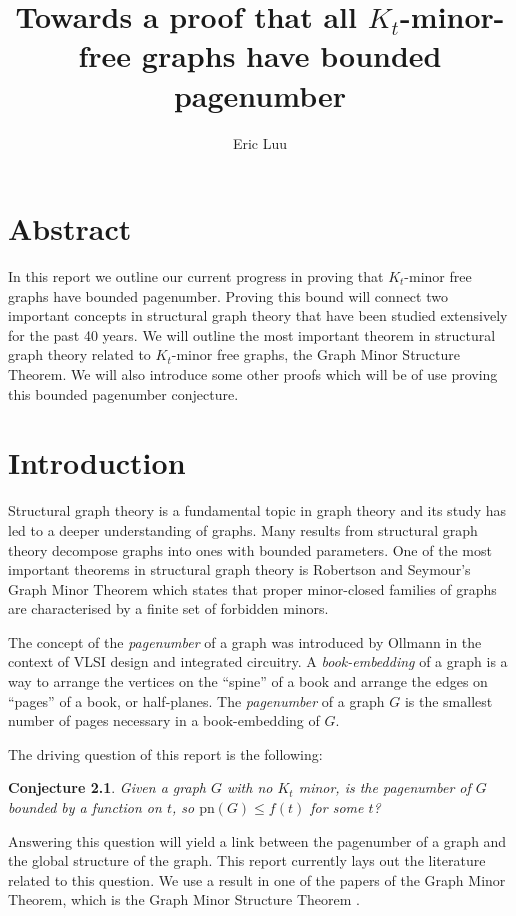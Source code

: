 \documentclass[]{report}
\title{Towards a proof that all $K_t$-minor-free graphs have bounded pagenumber}
\author{Eric Luu}
\newcommand{\pn}{\text{pn}}
\newtheorem{conjecture}[theorem]{Conjecture}
\theoremstyle{definition}
\numberwithin{theorem}{section}
\numberwithin{equation}{section}
\begin{document}
\maketitle
\chapter{Abstract}\label{abstract}
In this report we outline our current progress in proving that $K_t$-minor free graphs have bounded pagenumber. Proving this bound will connect two important concepts in structural graph theory that have been studied extensively for the past 40 years. We will outline the most important theorem in structural graph theory related to $K_t$-minor free graphs, the Graph Minor Structure Theorem. We will also introduce some other proofs which will be of use proving this bounded pagenumber conjecture. 
\chapter{Introduction}\label{sec:introduction}
Structural graph theory is a fundamental topic in graph theory and its study has led to a deeper understanding of graphs. Many results from structural graph theory decompose graphs into ones with bounded parameters. One of the most important theorems in structural graph theory is Robertson and Seymour's Graph Minor Theorem \cite{robertsonGraphMinorsXX2004} which states that proper minor-closed families of graphs are characterised by a finite set of forbidden minors. 
\par
The concept of the \textit{pagenumber} of a graph was introduced by Ollmann \cite{ollmannBookThicknessVarious1973} in the context of VLSI design and integrated circuitry. A \textit{book-embedding} of a graph is a way to arrange the vertices on the ``spine'' of a book and arrange the edges on ``pages'' of a book, or half-planes. The \textit{pagenumber} of a graph $G$ is the smallest number of pages necessary in a book-embedding of $G$. 

The driving question of this report is the following: 
\begin{conjecture}\label{conj:bded_had_pn}
	Given a graph $G$ with no $K_t$ minor, is the pagenumber of $G$ bounded by a function on $t$, so $\pn(G) \leq f(t)$ for some $t$?
\end{conjecture}
Answering this question will yield a link between the pagenumber of a graph and the global structure of the graph. This report currently lays out the literature related to this question. We use a result in one of the papers of the Graph Minor Theorem, which is the Graph Minor Structure Theorem \cite{robertsonGraphMinorsXVI2003}.
\end{document}
